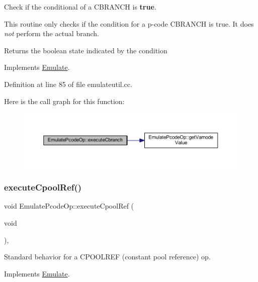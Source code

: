 Check if the conditional of a C\+B\+R\+A\+N\+CH is {\bfseries{true}}. 

This routine only checks if the condition for a p-\/code C\+B\+R\+A\+N\+CH is true. It does {\itshape not} perform the actual branch. \begin{DoxyReturn}{Returns}
the boolean state indicated by the condition 
\end{DoxyReturn}


Implements \mbox{\hyperlink{class_emulate_ac0dbab7129d69471d8400a75c0c7c1b5}{Emulate}}.



Definition at line 85 of file emulateutil.\+cc.

Here is the call graph for this function\+:
\nopagebreak
\begin{figure}[H]
\begin{center}
\leavevmode
\includegraphics[width=350pt]{class_emulate_pcode_op_a5aa70550f3f75829976b082a87d50d8f_cgraph}
\end{center}
\end{figure}
\mbox{\label{class_emulate_pcode_op_aa1075926534682debaaab82d47f51a03}} 
\subsubsection{\texorpdfstring{executeCpoolRef()}{executeCpoolRef()}}
{\footnotesize\ttfamily void Emulate\+Pcode\+Op\+::execute\+Cpool\+Ref (\begin{DoxyParamCaption}\item[{void}]{ }\end{DoxyParamCaption})\hspace{0.3cm}{\ttfamily [protected]}, {\ttfamily [virtual]}}



Standard behavior for a C\+P\+O\+O\+L\+R\+EF (constant pool reference) op. 



Implements \mbox{\hyperlink{class_emulate_a544e0f87351d29a0336b56c06fe8b3c3}{Emulate}}.



